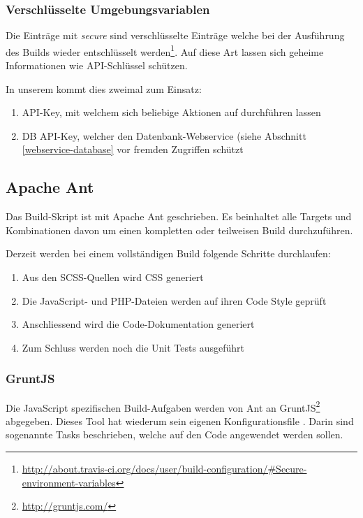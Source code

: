 \subsubsection{Verschlüsselte Umgebungsvariablen}
Die Einträge mit \emph{secure} sind verschlüsselte Einträge welche bei der Ausführung des Builds wieder entschlüsselt werden\footnote{\url{http://about.travis-ci.org/docs/user/build-configuration/\#Secure-environment-variables}}.
Auf diese Art lassen sich geheime Informationen wie API-Schlüssel schützen.

In unserem  kommt dies zweimal zum Einsatz:
\begin{enumerate}
\item {} \gls{API}-Key, mit welchem sich beliebige Aktionen auf  durchführen lassen
\item \kort{} DB \gls{API}-Key, welcher den Datenbank-Webservice (siehe Abschnitt \ref{webservice-database} vor fremden Zugriffen schützt
\end{enumerate}

\subsection{Apache Ant}
Das Build-Skript ist mit Apache Ant geschrieben.
Es beinhaltet alle Targets und Kombinationen davon um einen kompletten oder teilweisen Build durchzuführen.

Derzeit werden bei einem vollständigen Build folgende Schritte durchlaufen:
\begin{enumerate}
\item Aus den SCSS-Quellen wird CSS generiert
\item Die JavaScript- und PHP-Dateien werden auf ihren Code Style geprüft
\item Anschliessend wird die Code-Dokumentation generiert
\item Zum Schluss werden noch die Unit Tests ausgeführt
\end{enumerate}

\subsubsection{GruntJS}
\label{gruntjs}
Die JavaScript spezifischen Build-Aufgaben werden von Ant an GruntJS\footnote{\url{http://gruntjs.com/}} abgegeben.
Dieses Tool hat wiederum sein eigenen Konfigurationsfile .
Darin sind sogenannte Tasks beschrieben, welche auf den Code angewendet werden sollen.

